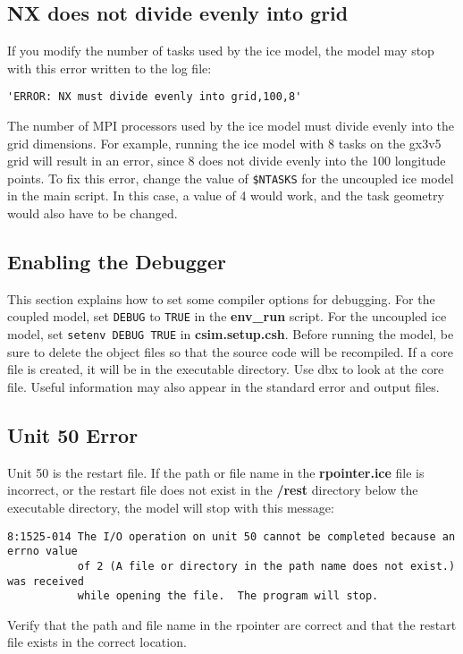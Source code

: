 \subsection{NX does not divide evenly into grid}

If you modify the number of tasks used by the ice model, the model may stop
with this error written to the log file:
\begin{verbatim}
'ERROR: NX must divide evenly into grid,100,8'
\end{verbatim}

The number of MPI processors used by the ice model must divide evenly into the grid
dimensions.  For example, running the ice model with 8 tasks on the gx3v5
grid will result in an error, since 8 does not divide evenly into the
100 longitude points.  To fix this error, change the value of {\tt \$NTASKS} for the
uncoupled ice model in the main script.  In this case, a value of 4 would work, and
the task geometry would also have to be changed.

\subsection{Enabling the Debugger}

This section explains how to set some compiler options for debugging. For
the coupled model, set {\tt DEBUG} to {\tt TRUE} in the {\bf env\_run} script.
For the uncoupled ice model, set {\tt setenv DEBUG TRUE} in
{\bf csim.setup.csh}.  Before running the model, be sure to delete the
object files so that the source code will be recompiled.  If a core file
is created, it will be in the executable directory.  Use dbx to look at
the core file. Useful information may also appear in the standard error
and output files.

\subsection{Unit 50 Error}

Unit 50 is the restart file.  If the path or file name in the {\bf rpointer.ice}
file is incorrect, or the restart file does not exist in the {\bf /rest} directory
below the executable directory, the model will stop with this message:

\begin{verbatim}
8:1525-014 The I/O operation on unit 50 cannot be completed because an errno value
           of 2 (A file or directory in the path name does not exist.) was received
           while opening the file.  The program will stop.
\end{verbatim}

Verify that the path and file name in the rpointer are correct and that the restart
file exists in the correct location.

